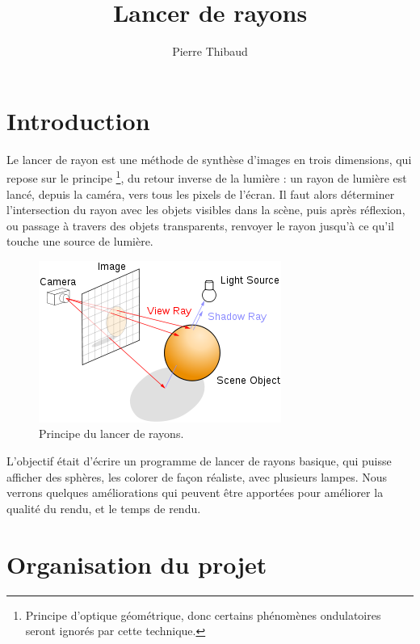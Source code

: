 \documentclass[10pt,a4paper]{article}
\author{Pierre \bsc{Donat-Bouillud} Thibaud \bsc{Ehret}}
\title{Lancer de rayons}
\begin{document}
\maketitle

\section*{Introduction} %
Le lancer de rayon est une méthode de synthèse d'images en trois dimensions, qui repose sur le principe \footnote{Principe d'optique géométrique, donc certains phénomènes
ondulatoires seront ignorés par cette technique.}, du retour inverse de la lumière : un rayon de lumière est lancé, depuis la caméra, vers tous les pixels de l'écran. 
Il faut alors déterminer l'intersection du rayon avec les objets visibles dans la scène, puis après réflexion, ou passage à travers des objets transparents, renvoyer le rayon jusqu'à ce qu'il touche une source de lumière.
\begin{figure}[!h]
\begin{center}
\includegraphics[scale=0.5]{../presentation/raytracing.png}
\end{center}
\caption{Principe du lancer de rayons.}
\end{figure}
L'objectif était d'écrire un programme de lancer de rayons basique, qui puisse afficher des sphères, les colorer de façon réaliste, avec plusieurs lampes.
Nous verrons quelques améliorations qui peuvent être apportées pour améliorer la qualité du rendu, et le temps de rendu.

\tableofcontents

\section{Organisation du projet} %


\end{document}
